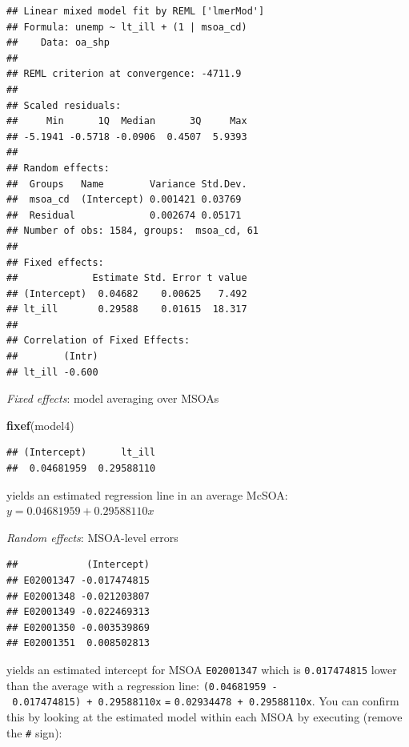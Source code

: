 \documentclass[
]{book}
\newenvironment{Shaded}{\begin{snugshade}}{\end{snugshade}}
\newcommand{\DecValTok}[1]{\textcolor[rgb]{0.00,0.00,0.81}{#1}}
\newcommand{\KeywordTok}[1]{\textcolor[rgb]{0.13,0.29,0.53}{\textbf{#1}}}
\newcommand{\NormalTok}[1]{#1}
\newcommand{\OperatorTok}[1]{\textcolor[rgb]{0.81,0.36,0.00}{\textbf{#1}}}
\newcommand{\StringTok}[1]{\textcolor[rgb]{0.31,0.60,0.02}{#1}}
\begin{document}
\begin{verbatim}
## Linear mixed model fit by REML ['lmerMod']
## Formula: unemp ~ lt_ill + (1 | msoa_cd)
##    Data: oa_shp
## 
## REML criterion at convergence: -4711.9
## 
## Scaled residuals: 
##     Min      1Q  Median      3Q     Max 
## -5.1941 -0.5718 -0.0906  0.4507  5.9393 
## 
## Random effects:
##  Groups   Name        Variance Std.Dev.
##  msoa_cd  (Intercept) 0.001421 0.03769 
##  Residual             0.002674 0.05171 
## Number of obs: 1584, groups:  msoa_cd, 61
## 
## Fixed effects:
##             Estimate Std. Error t value
## (Intercept)  0.04682    0.00625   7.492
## lt_ill       0.29588    0.01615  18.317
## 
## Correlation of Fixed Effects:
##        (Intr)
## lt_ill -0.600
\end{verbatim}

\emph{Fixed effects}: model averaging over MSOAs

\begin{Shaded}
\begin{Highlighting}[]
\KeywordTok{fixef}\NormalTok{(model4)}
\end{Highlighting}
\end{Shaded}

\begin{verbatim}
## (Intercept)      lt_ill 
##  0.04681959  0.29588110
\end{verbatim}

yields an estimated regression line in an average McSOA: \(y = 0.04681959 + 0.29588110x\)

\emph{Random effects}: MSOA-level errors

\begin{Shaded}
\end{Shaded}

\begin{verbatim}
##            (Intercept)
## E02001347 -0.017474815
## E02001348 -0.021203807
## E02001349 -0.022469313
## E02001350 -0.003539869
## E02001351  0.008502813
\end{verbatim}

yields an estimated intercept for MSOA \texttt{E02001347} which is \texttt{0.017474815} lower than the average with a regression line: \texttt{(0.04681959\ -\ 0.017474815)\ +\ 0.29588110x} \texttt{=} \texttt{0.02934478\ +\ 0.29588110x}. You can confirm this by looking at the estimated model within each MSOA by executing (remove the \texttt{\#} sign):
\end{document}
